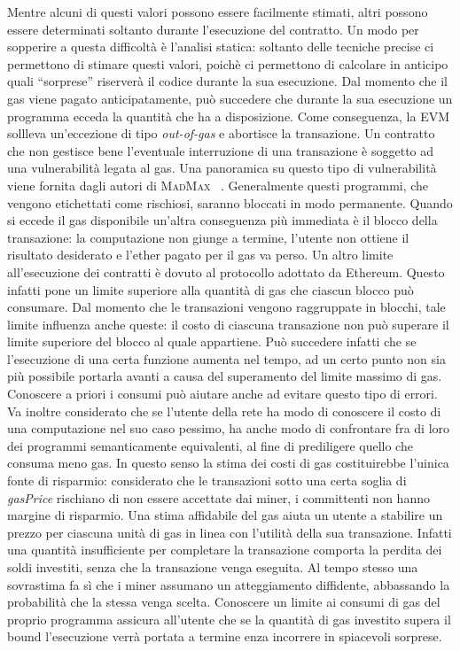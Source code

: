 	Mentre alcuni di questi valori possono essere facilmente stimati, altri possono essere determinati soltanto durante l'esecuzione del contratto. Un modo per sopperire a questa difficoltà è l'analisi statica: soltanto delle tecniche precise ci permettono di stimare questi valori, poichè ci permettono di calcolare in anticipo quali ``sorprese'' riserverà il codice durante la sua esecuzione.\newline
	\indent Dal momento che il gas viene pagato anticipatamente, può succedere che durante la sua
	esecuzione un programma ecceda la quantità che ha a disposizione. Come conseguenza, la EVM
	sollleva un'eccezione di tipo \textit{out-of-gas} e abortisce la transazione. Un contratto
	che non gestisce bene l'eventuale interruzione di una transazione è soggetto ad una 
	vulnerabilità legata al gas. Una panoramica su questo tipo di vulnerabilità viene fornita dagli autori di \textsc{MadMax} ~\cite{grech2018madmax}. Generalmente questi programmi, che vengono etichettati
	come rischiosi, saranno bloccati in modo permanente.
	Quando si eccede il gas disponibile un'altra conseguenza più immediata è il
	blocco della transazione: la computazione non giunge a termine, l'utente non ottiene il
	risultato desiderato e l'ether pagato per il gas va perso.\newline
	\indent Un altro limite all'esecuzione dei contratti è dovuto al protocollo adottato da Ethereum.
	Questo infatti pone un limite superiore alla quantità di gas che ciascun blocco può consumare. Dal momento che le transazioni vengono raggruppate in blocchi,
	tale limite influenza anche queste: il costo di ciascuna transazione non può superare il limite superiore del blocco al quale appartiene. Può succedere infatti che
	se l'esecuzione di una certa funzione aumenta nel tempo, ad un certo punto non sia
	più possibile portarla avanti a causa del superamento del limite massimo di gas.
	Conoscere a priori i consumi può aiutare anche ad evitare questo tipo di errori.\newline
	\indent Va inoltre considerato che se l'utente della rete ha modo di conoscere il costo
	di una computazione nel suo caso pessimo, ha anche modo di confrontare fra di loro dei programmi
	semanticamente equivalenti, al fine di prediligere quello che consuma meno gas.  In questo 
	senso la stima dei costi di gas costituirebbe l'uinica fonte di risparmio: considerato
	che le transazioni sotto una certa soglia di \textit{gasPrice} rischiano di non essere 
	accettate dai miner, i committenti non hanno margine di risparmio.\newline
	\indent Una stima affidabile del gas aiuta un utente a stabilire un prezzo per ciascuna
	unità di gas in linea con l'utilità della sua transazione. Infatti una quantità 
	insufficiente per completare la transazione comporta la perdita dei soldi investiti,
	senza che la transazione venga eseguita. Al tempo stesso una sovrastima fa sì che i
	miner assumano un atteggiamento diffidente, abbassando la probabilità che la stessa
	venga scelta.\newline
	\indent Conoscere un limite ai consumi di gas del proprio programma assicura all'utente
	che se la quantità di gas investito supera il bound l'esecuzione verrà portata a termine
	 enza incorrere in spiacevoli sorprese.


	\newpage
